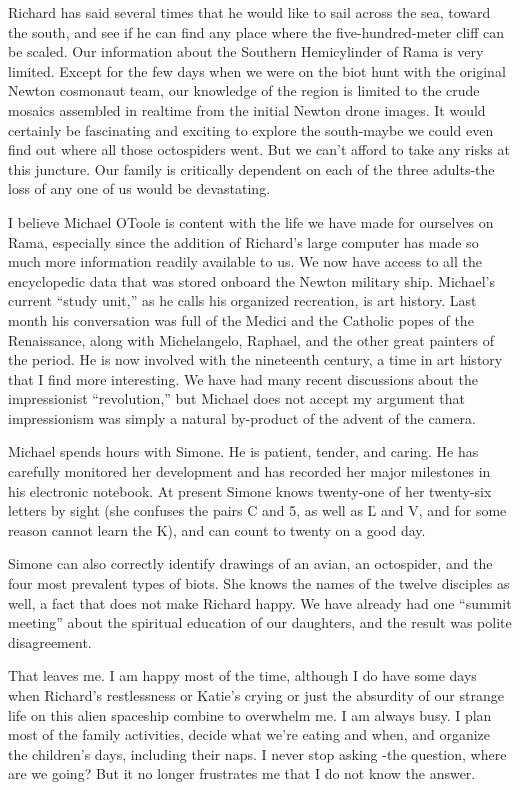 \documentclass[]{article}
\begin{document}
Richard has said several times that he would like to sail across the sea, toward the south, and see if he can find any place where the five-hundred-meter cliff can be scaled. Our information about the Southern Hemicylinder of Rama is very limited. Except for the few days when we were on the biot hunt with the original Newton cosmonaut team, our knowledge of the region is limited to the crude mosaics assembled in realtime from the initial Newton drone images. It would certainly be fascinating and exciting to explore the south-maybe we could even find out where all those octospiders went. But we can’t afford to take any risks at this juncture. Our family is critically dependent on each of the three adults-the loss of any one of us would be devastating.

I believe Michael OToole is content with the life we have made for ourselves on Rama, especially since the addition of Richard’s large computer has made so much more information readily available to us. We now have access to all the encyclopedic data that was stored onboard the Newton military ship. Michael’s current “study unit,” as he calls his organized recreation, is art history. Last month his conversation was full of the Medici and the Catholic popes of the Renaissance, along with Michelangelo, Raphael, and the other great painters of the period. He is now involved with the nineteenth century, a time in art history that I find more interesting. We have had many recent discussions about the impressionist “revolution,” but Michael does not accept my argument that impressionism was simply a natural by-product of the advent of the camera.

Michael spends hours with Simone. He is patient, tender, and caring. He has carefully monitored her development and has recorded her major milestones in his electronic notebook. At present Simone knows twenty-one of her twenty-six letters by sight (she confuses the pairs C and 5, as well as Ľ and V, and for some reason cannot learn the K), and can count to twenty on a good day.

Simone can also correctly identify drawings of an avian, an octospider, and the four most prevalent types of biots. She knows the names of the twelve disciples as well, a fact that does not make Richard happy. We have already had one “summit meeting” about the spiritual education of our daughters, and the result was polite disagreement.

That leaves me. I am happy most of the time, although I do have some days when Richard’s restlessness or Katie’s crying or just the absurdity of our strange life on this alien spaceship combine to overwhelm me. I am always busy. I plan most of the family activities, decide what we’re eating and when, and organize the children’s days, including their naps. I never stop asking -the question, where are we going? But it no longer frustrates me that I do not know the answer.
\end{document}
